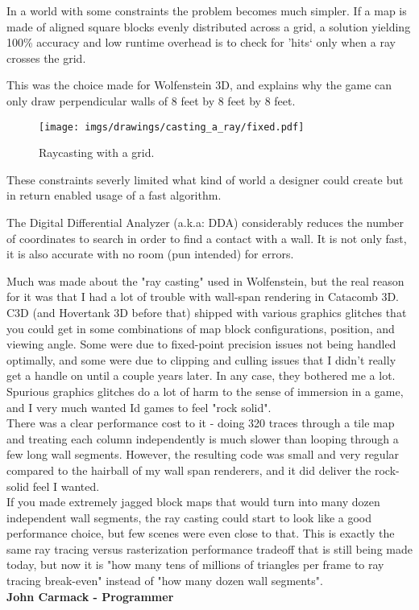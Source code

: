 In a world with some constraints the problem becomes much simpler. If a map is made of aligned square blocks evenly distributed across a grid, a solution yielding 100\% accuracy and low runtime overhead is to check for 'hits` only when a ray crosses the grid.\\
\par
 This was the choice made for Wolfenstein 3D, and explains why the game can only draw perpendicular walls of 8 feet by 8 feet by 8 feet.\\
\par
\begin{figure}[H]
\centering
\texttt{[image: imgs/drawings/casting\_a\_ray/fixed.pdf]}
 \caption{Raycasting with a grid.}
\end{figure}
\par
These constraints severly limited what kind of world a designer could create but in return enabled usage of a fast algorithm.\\
\par
The Digital Differential Analyzer (a.k.a: DDA) considerably reduces the number of coordinates to search in order to find a contact with a wall. It is not only fast, it is also accurate with no room (pun intended) for errors.
\par
\begin{fancyquotes}
\par
Much was made about the "ray casting" used in Wolfenstein, but the real reason for it was that I had a lot of trouble with wall-span rendering in Catacomb 3D.  C3D (and Hovertank 3D before that) shipped with various graphics glitches that you could get in some combinations of map block configurations, position, and viewing angle.  Some were due to fixed-point precision issues not being handled optimally, and some were due to clipping and culling issues that I didn't really get a handle on until a couple years later.  In any case, they bothered me a lot.  Spurious graphics glitches do a lot of harm to the sense of immersion in a game, and I very much wanted Id games to feel "rock solid".
 \bigskip \\
There was a clear performance cost to it - doing 320 traces through a tile map and treating each column independently is much slower than looping through a few long wall segments.  However, the resulting code was small and very regular compared to the hairball of my wall span renderers, and it did deliver the rock-solid feel I wanted.
 \bigskip \\
If you made extremely jagged block maps that would turn into many dozen independent wall segments, the ray casting could start to look like a good performance choice, but few scenes were even close to that.  This is exactly the same ray tracing versus rasterization performance tradeoff that is still being made today, but now it is "how many tens of millions of triangles per frame to ray tracing break-even" instead of "how many dozen wall segments".
 \bigskip \\
\textbf{John Carmack - Programmer}
 \end{fancyquotes}\\
\par


